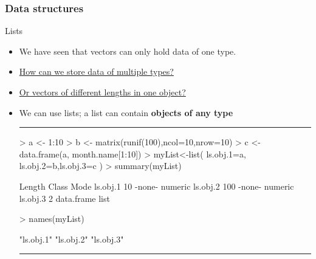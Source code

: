 \documentclass{beamer}
\begin{document}
\begin{frame}[fragile]
	\frametitle{Data structures}
	\centering \LARGE Lists
	\begin{itemize}
		\small
		\item We have seen that vectors can only hold data of one type. 
		\item \underline{How can we store data of multiple types?} 
		\item \underline{Or vectors of different lengths in one object?}
		\item We can use lists; a list can contain \textbf{objects of any type}
\rule{\textwidth}{0.4pt}
\tiny
\begin{Schunk}
\begin{Sinput}
> a <- 1:10
> b <- matrix(runif(100),ncol=10,nrow=10)
> c <- data.frame(a, month.name[1:10])
> myList<-list( ls.obj.1=a, ls.obj.2=b,ls.obj.3=c )
> summary(myList)
\end{Sinput}
\begin{Soutput}
         Length Class      Mode   
ls.obj.1  10    -none-     numeric
ls.obj.2 100    -none-     numeric
ls.obj.3   2    data.frame list   
\end{Soutput}
\end{Schunk}
\vspace{20pt}
\setlength{\fancyvrbtopsep}{-1pt}
\setlength{\fancyvrbpartopsep}{-1pt}
\begin{Schunk}
\begin{Sinput}
> names(myList)
\end{Sinput}
\begin{Soutput}
[1] "ls.obj.1" "ls.obj.2" "ls.obj.3"
\end{Soutput}
\end{Schunk}

\rule{\textwidth}{0.4pt}\\
\small
	\end{itemize}
\end{frame}
\end{document}
